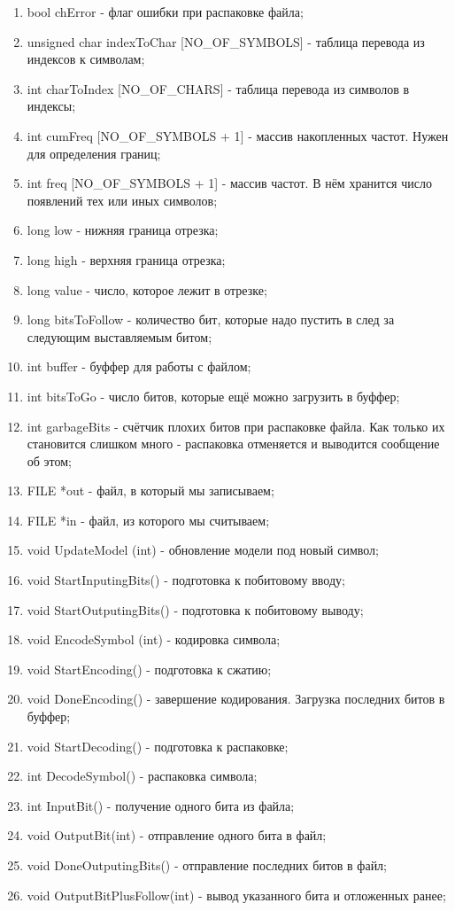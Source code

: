 \documentclass[12pt]{article}
\begin{document}
\begin{enumerate}
	\item bool chError - флаг ошибки при распаковке файла;
	\item unsigned char indexToChar [NO\_OF\_SYMBOLS] - таблица перевода из индексов к символам;
	\item int charToIndex [NO\_OF\_CHARS] - таблица перевода из символов в индексы;
	\item int cumFreq [NO\_OF\_SYMBOLS + 1] - массив накопленных частот. Нужен для определения границ;
	\item int freq [NO\_OF\_SYMBOLS + 1] - массив частот. В нём хранится число появлений тех или иных символов;
	\item long low - нижняя граница отрезка; 
	\item long high - верхняя граница отрезка;
	\item long value - число, которое лежит в отрезке;
	\item long bitsToFollow - количество бит, которые надо пустить в след за следующим выставляемым битом;
	\item int buffer - буффер для работы с файлом;
	\item int bitsToGo - число битов, которые ещё можно загрузить в буффер;
	\item int garbageBits - счётчик плохих битов при распаковке файла. Как только их становится слишком много - распаковка отменяется и выводится сообщение об этом;
	\item FILE *out - файл, в который мы записываем;
	\item FILE *in - файл, из которого мы считываем;
	\item void UpdateModel (int) - обновление модели под новый символ;
	\item void StartInputingBits() - подготовка к побитовому вводу;
	\item void StartOutputingBits() - подготовка к побитовому выводу;
	\item void EncodeSymbol (int) - кодировка символа;
	\item void StartEncoding() - подготовка к сжатию;
	\item void DoneEncoding() - завершение кодирования. Загрузка последних битов в буффер;
	\item void StartDecoding() - подготовка к распаковке;
	\item int DecodeSymbol() - распаковка символа;
	\item int InputBit() - получение одного бита из файла;
	\item void OutputBit(int) - отправление одного бита в файл;
	\item void DoneOutputingBits() - отправление последних битов в файл;
	\item void OutputBitPlusFollow(int) - вывод указанного бита и отложенных ранее;
\end{enumerate}
\end{document}
